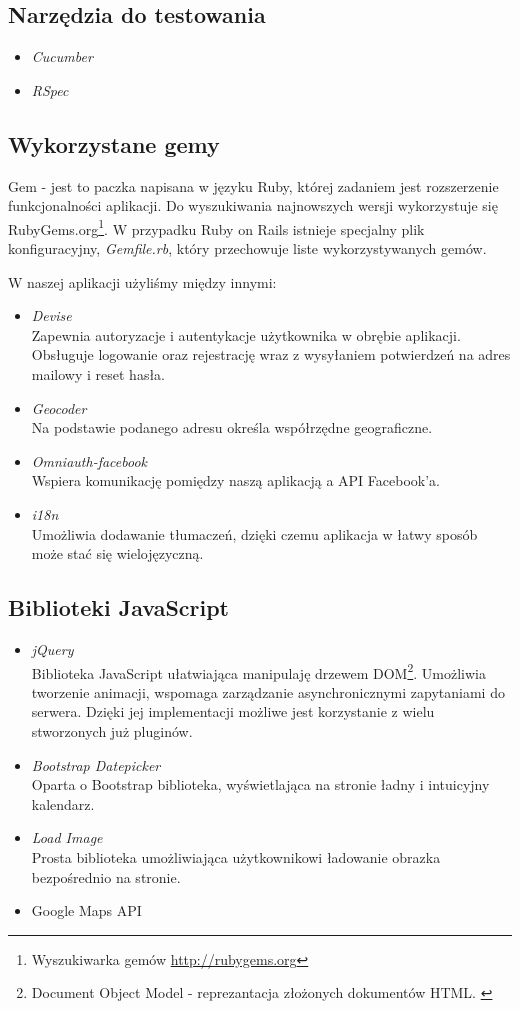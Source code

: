   \subsection{Narzędzia do testowania}
    \begin{itemize}
      \item \emph{Cucumber}
      \item \emph{RSpec}
    \end{itemize}
  \subsection{Wykorzystane gemy}
    Gem - jest to paczka napisana w języku Ruby, której zadaniem jest rozszerzenie funkcjonalności aplikacji. Do wyszukiwania najnowszych wersji wykorzystuje się RubyGems.org\footnote{Wyszukiwarka gemów \url{http://rubygems.org}}. W przypadku Ruby on Rails istnieje specjalny plik konfiguracyjny, \emph{Gemfile.rb}, który przechowuje liste wykorzystywanych gemów.

    W naszej aplikacji użyliśmy między innymi:
    \begin{itemize}
      \item \emph{Devise} \\ Zapewnia autoryzacje i autentykacje użytkownika w obrębie aplikacji. Obsługuje logowanie oraz rejestrację wraz z wysyłaniem potwierdzeń na adres mailowy i reset hasła.
      \item \emph{Geocoder} \\ Na podstawie podanego adresu określa współrzędne geograficzne.
      \item \emph{Omniauth-facebook} \\ Wspiera komunikację pomiędzy naszą aplikacją a API Facebook'a.
      \item \emph{i18n} \\ Umożliwia dodawanie tłumaczeń, dzięki czemu aplikacja w łatwy sposób może stać się wielojęzyczną.
    \end{itemize}
  \subsection{Biblioteki JavaScript}
    \begin{itemize}
      \item \emph{jQuery} \\ Biblioteka JavaScript ułatwiająca manipulaję drzewem DOM\footnote{Document Object Model - reprezantacja złożonych dokumentów HTML. \cite{html5_css3}}. Umożliwia tworzenie animacji, wspomaga zarządzanie asynchronicznymi zapytaniami do serwera. Dzięki jej implementacji możliwe jest korzystanie z wielu stworzonych już pluginów.
      \item \emph{Bootstrap Datepicker} \\ Oparta o Bootstrap biblioteka, wyświetlająca na stronie ładny i intuicyjny kalendarz.
      \item \emph{Load Image} \\ Prosta biblioteka umożliwiająca użytkownikowi ładowanie obrazka bezpośrednio na stronie.
      \item Google Maps API
    \end{itemize}
